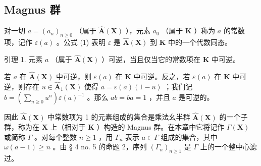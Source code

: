 \subsection{Magnus 群}

对一切 \(a = (a_n)_{n \geq 0}\) （属于 \(\hat{\mathbf{A}}(\mathbf{X})\) ），元素 \(a_0\) （属于 \(\mathbf{K}\) ）称为 \(a\) 的常数项，记作 \(\varepsilon(a)\) 。公式 (1) 表明 \(\varepsilon\) 是 \(\hat{\mathbf{A}}(\mathbf{X})\) 到 \(\mathbf{K}\) 中的一个代数同态。

引理 1. 元素 \(a\) （属于 \(\hat{\mathbf{A}}(\mathbf{X})\) ）可逆，当且仅当它的常数项在 \(\mathbf{K}\) 中可逆。

若 \(a\) 在 \(\hat{\mathbf{A}}(\mathbf{X})\) 中可逆，则 \(\varepsilon(a)\) 在 \(\mathbf{K}\) 中可逆。反之，若 \(\varepsilon(a)\) 在 \(\mathbf{K}\) 中可逆，则存在 \(u \in \hat{\mathbf{A}}_1(\mathbf{X})\) 使得 \(a = \varepsilon(a)(1 - u)\) ；我们记 \(b = \left(\sum_{n \geqslant 0} u^n\right)\varepsilon(a)^{-1}\) 。那么 \(ab = ba = 1\) ，并且 \(a\) 是可逆的。

因此 \(\hat{\mathbf{A}}(\mathbf{X})\) 中常数项为 1 的元素组成的集合是乘法幺半群 \(\hat{\mathbf{A}}(\mathbf{X})\) 的一个子群，称为在 \(\mathbf{X}\) 上（相对于 \(\mathbf{K}\) ）构造的 Magnus 群。在本章中它将记作 \(\Gamma(\mathbf{X})\) 或简称 \(\Gamma\) 。对每个整数 \(n \geqslant 1\) ，用 \(\Gamma_n\) 表示 \(a \in \Gamma\) 组成的集合，其中 \(\omega(a - 1) \geqslant n\) 。由 § 4 no. 5 的命题 2，序列 \((\Gamma_n)_{n \geqslant 1}\) 是 \(\Gamma\) 上的一个整中心滤过。

